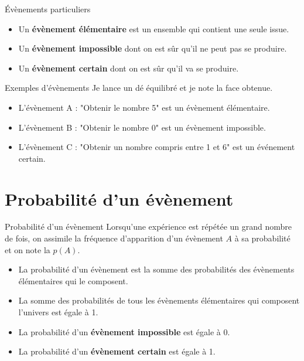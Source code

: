 \begin{pageCours}

\begin{DefT}{Évènements particuliers}
\begin{itemize}[leftmargin=*]
\item Un \textbf{évènement élémentaire} est un ensemble qui contient une seule issue. 
\item Un \textbf{évènement impossible} dont on est sûr qu'il ne peut pas se produire.  
\item Un \textbf{évènement certain}  dont on est sûr qu'il va se produire.  
\end{itemize}

\end{DefT}

\begin{ExT}{Exemples d'évènements}
Je lance un dé équilibré et je note la face obtenue. 

\begin{itemize}[leftmargin=*]
\item L'évènement A : "Obtenir le nombre 5" est un évènement élémentaire.  
\item L'évènement B : "Obtenir le nombre 0" est un évènement impossible.
\item L'évènement C : "Obtenir un nombre compris entre 1 et 6" est un événement certain.
\end{itemize}

\end{ExT}

\section{Probabilité d'un évènement}

\begin{DefT}{Probabilité d'un évènement}
Lorsqu'une expérience est répétée un grand nombre de fois, on assimile la fréquence d'apparition d'un évènement $A$ à sa probabilité et on note la $p(A)$.
\end{DefT}
 
\begin{Pps}
\begin{itemize}[leftmargin=*]
\item La probabilité d'un évènement est la somme des probabilités des évènements élémentaires qui le composent.  
\item La somme des probabilités de tous les évènements élémentaires qui composent l'univers est égale à 1.  
\item La probabilité d'un \textbf{évènement impossible} est égale à 0.  
\item La probabilité d'un \textbf{évènement certain} est égale à 1.  
\end{itemize}
\end{Pps}


\end{pageCours}
